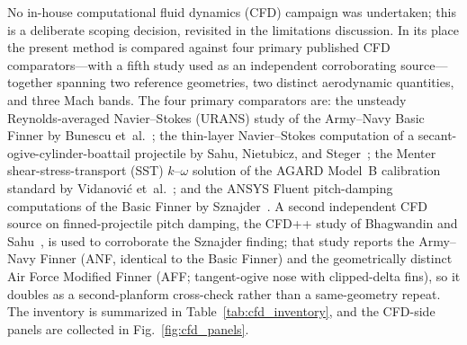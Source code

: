 
No in-house computational fluid dynamics (CFD) campaign was undertaken; this is a
deliberate scoping decision, revisited in the limitations discussion. In its place
the present method is compared against four primary published CFD comparators---with
a fifth study used as an independent corroborating source---together spanning two
reference geometries, two distinct aerodynamic quantities, and three Mach bands. The
four primary comparators are: the unsteady Reynolds-averaged
Navier--Stokes (URANS) study of the Army--Navy Basic Finner by
Bunescu et~al.~\cite{bunescu2025}; the thin-layer Navier--Stokes computation of a
secant-ogive-cylinder-boattail projectile by Sahu, Nietubicz, and
Steger~\cite{sahu1983}; the Menter shear-stress-transport (SST) $k$--$\omega$
solution of the AGARD Model~B calibration standard by
Vidanovi\'c et~al.~\cite{vidanovic2014}; and the ANSYS Fluent pitch-damping
computations of the Basic Finner by Sznajder~\cite{sznajder2025}. A second
independent CFD source on finned-projectile pitch damping, the CFD++ study of
Bhagwandin and Sahu~\cite{bhagwandin2013}, is used to corroborate the Sznajder
finding; that study reports the Army--Navy Finner (ANF, identical to the Basic
Finner) and the geometrically distinct Air Force Modified Finner (AFF;
tangent-ogive nose with clipped-delta fins), so it doubles as a second-planform
cross-check rather than a same-geometry repeat. The inventory is summarized in
Table~\ref{tab:cfd_inventory}, and the CFD-side panels are collected in
Fig.~\ref{fig:cfd_panels}.

